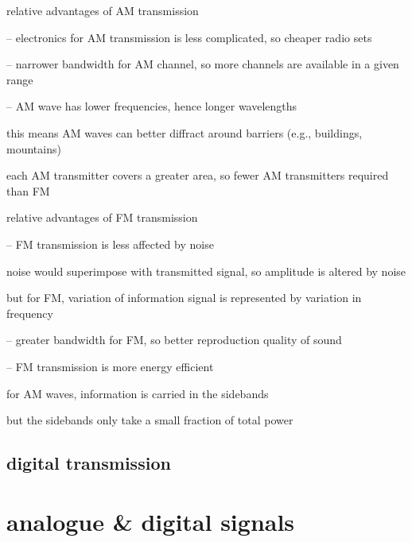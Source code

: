 \cmt relative advantages of AM transmission

\begin{compactitem}
	\item[--] electronics for AM transmission is less complicated, so cheaper radio sets
	
	\item[--] narrower bandwidth for AM channel, so more channels are available in a given range
	
	\item[--] AM wave has lower frequencies, hence longer wavelengths
	
	this means AM waves can better diffract around barriers (e.g., buildings, mountains)
	
	each AM transmitter covers a greater area, so fewer AM transmitters required than FM
	
\end{compactitem}


\cmt relative advantages of FM transmission

\begin{compactitem}
	\item[--] FM transmission is less affected by noise
	
	noise would superimpose with transmitted signal, so amplitude is altered by noise
	
	but for FM, variation of information signal is represented by variation in frequency
	
	\item[--] greater bandwidth for FM, so better reproduction quality of sound
	
	\item[--] FM transmission is more energy efficient
	
	for AM waves, information is carried in the sidebands
	
	but the sidebands only take a small fraction of total power
	
\end{compactitem}





\subsection{digital transmission}\label{digital-transmission}

\section{analogue \& digital signals}

